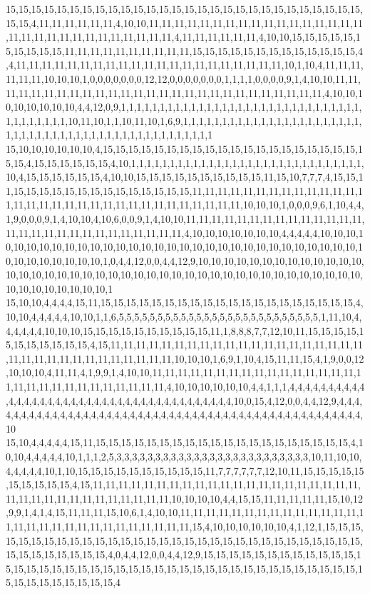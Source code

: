 15,15,15,15,15,15,15,15,15,15,15,15,15,15,15,15,15,15,15,15,15,15,15,15,15,15,15,15,15,15,4,11,11,11,11,11,11,4,10,10,11,11,11,11,11,11,11,11,11,11,11,11,11,11,11,11,11,11,11,11,11,11,11,11,11,11,11,11,11,11,4,11,11,11,11,11,11,4,10,10,15,15,15,15,15,15,15,15,15,15,11,11,11,11,11,11,11,11,11,11,15,15,15,15,15,15,15,15,15,15,15,15,15,4,4,11,11,11,11,11,11,11,11,11,11,11,11,11,11,11,11,11,11,11,11,11,10,1,10,4,11,11,11,11,11,11,10,10,10,1,0,0,0,0,0,0,0,12,12,0,0,0,0,0,0,0,1,1,1,1,0,0,0,0,9,1,4,10,10,11,11,11,11,11,11,11,11,11,11,11,11,11,11,11,11,11,11,11,11,11,11,11,11,11,11,11,4,10,10,10,10,10,10,10,10,4,4,12,0,9,1,1,1,1,1,1,1,1,1,1,1,1,1,1,1,1,1,1,1,1,1,1,1,1,1,1,1,1,1,1,1,1,1,1,1,1,1,1,1,10,11,10,1,1,10,11,10,1,6,9,1,1,1,1,1,1,1,1,1,1,1,1,1,1,1,1,1,1,1,1,1,1,1,1,1,1,1,1,1,1,1,1,1,1,1,1,1,1,1,1,1,1,1,1,1,1,1,1,1,1
15,10,10,10,10,10,10,4,15,15,15,15,15,15,15,15,15,15,15,15,15,15,15,15,15,15,15,15,15,15,4,15,15,15,15,15,15,4,10,1,1,1,1,1,1,1,1,1,1,1,1,1,1,1,1,1,1,1,1,1,1,1,1,1,1,1,1,1,1,10,4,15,15,15,15,15,15,4,10,10,15,15,15,15,15,15,15,15,15,15,11,15,10,7,7,7,4,15,15,11,15,15,15,15,15,15,15,15,15,15,15,15,15,15,11,11,11,11,11,11,11,11,11,11,11,11,11,11,11,11,11,11,11,11,11,11,11,11,11,11,11,11,11,11,11,11,10,10,10,1,0,0,0,9,6,1,10,4,4,1,9,0,0,0,9,1,4,10,10,4,10,6,0,0,9,1,4,10,10,11,11,11,11,11,11,11,11,11,11,11,11,11,11,11,11,11,11,11,11,11,11,11,11,11,11,11,11,4,10,10,10,10,10,10,10,4,4,4,4,4,10,10,10,10,10,10,10,10,10,10,10,10,10,10,10,10,10,10,10,10,10,10,10,10,10,10,10,10,10,10,10,10,10,10,10,10,10,10,10,1,0,4,4,12,0,0,4,4,12,9,10,10,10,10,10,10,10,10,10,10,10,10,10,10,10,10,10,10,10,10,10,10,10,10,10,10,10,10,10,10,10,10,10,10,10,10,10,10,10,10,10,10,10,10,10,10,10,10,10,1
15,10,10,4,4,4,4,15,11,15,15,15,15,15,15,15,15,15,15,15,15,15,15,15,15,15,15,15,15,4,10,10,4,4,4,4,4,10,10,1,1,6,5,5,5,5,5,5,5,5,5,5,5,5,5,5,5,5,5,5,5,5,5,5,5,5,5,5,1,11,10,4,4,4,4,4,4,10,10,10,15,15,15,15,15,15,15,15,15,15,11,1,8,8,8,7,7,12,10,11,15,15,15,15,15,15,15,15,15,15,15,4,15,11,11,11,11,11,11,11,11,11,11,11,11,11,11,11,11,11,11,11,11,11,11,11,11,11,11,11,11,11,11,11,11,11,10,10,10,1,6,9,1,10,4,15,11,11,15,4,1,9,0,0,12,10,10,10,4,11,11,4,1,9,9,1,4,10,10,11,11,11,11,11,11,11,11,11,11,11,11,11,11,11,11,11,11,11,11,11,11,11,11,11,11,11,11,11,4,10,10,10,10,10,10,4,4,1,1,1,4,4,4,4,4,4,4,4,4,4,4,4,4,4,4,4,4,4,4,4,4,4,4,4,4,4,4,4,4,4,4,4,4,4,4,4,4,4,4,10,0,15,4,12,0,0,4,4,12,9,4,4,4,4,4,4,4,4,4,4,4,4,4,4,4,4,4,4,4,4,4,4,4,4,4,4,4,4,4,4,4,4,4,4,4,4,4,4,4,4,4,4,4,4,4,4,4,4,4,10
15,10,4,4,4,4,4,15,11,15,15,15,15,15,15,15,15,15,15,15,15,15,15,15,15,15,15,15,15,4,10,10,4,4,4,4,4,10,1,1,1,2,5,3,3,3,3,3,3,3,3,3,3,3,3,3,3,3,3,3,3,3,3,3,3,3,3,3,10,11,10,10,4,4,4,4,4,10,1,10,15,15,15,15,15,15,15,15,15,15,11,7,7,7,7,7,7,12,10,11,15,15,15,15,15,15,15,15,15,15,4,15,11,11,11,11,11,11,11,11,11,11,11,11,11,11,11,11,11,11,11,11,11,11,11,11,11,11,11,11,11,11,11,11,11,11,10,10,10,10,4,4,15,15,11,11,11,11,11,15,10,12,9,9,1,4,1,4,15,11,11,11,15,10,6,1,4,10,10,11,11,11,11,11,11,11,11,11,11,11,11,11,11,11,11,11,11,11,11,11,11,11,11,11,11,11,11,11,15,4,10,10,10,10,10,10,4,1,12,1,15,15,15,15,15,15,15,15,15,15,15,15,15,15,15,15,15,15,15,15,15,15,15,15,15,15,15,15,15,15,15,15,15,15,15,15,15,15,15,4,0,4,4,12,0,0,4,4,12,9,15,15,15,15,15,15,15,15,15,15,15,15,15,15,15,15,15,15,15,15,15,15,15,15,15,15,15,15,15,15,15,15,15,15,15,15,15,15,15,15,15,15,15,15,15,15,15,15,15,4
